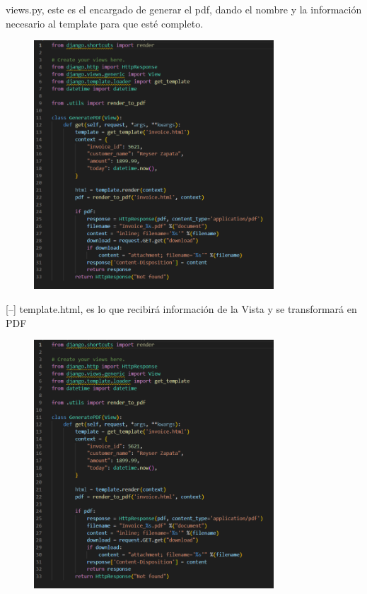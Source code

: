 \documentclass{article}
\begin{document}
\begin{enumerate}
\begin{description}
			[--] views.py, este es el encargado de generar el pdf, dando el nombre y la información necesario al template para que esté completo.
			\begin{figure}[H]
				\centering
				\includegraphics[width=0.8\textwidth,keepaspectratio]{img/Ejercicio3/view.png}
			\end{figure}
			[--] template.html, es lo que recibirá información de la Vista y se transformará en PDF
			\begin{figure}[H]
				\centering
				\includegraphics[width=0.8\textwidth,keepaspectratio]{img/Ejercicio3/view.png}

\end{figure}
\end{description}
\end{enumerate}
\end{document}
